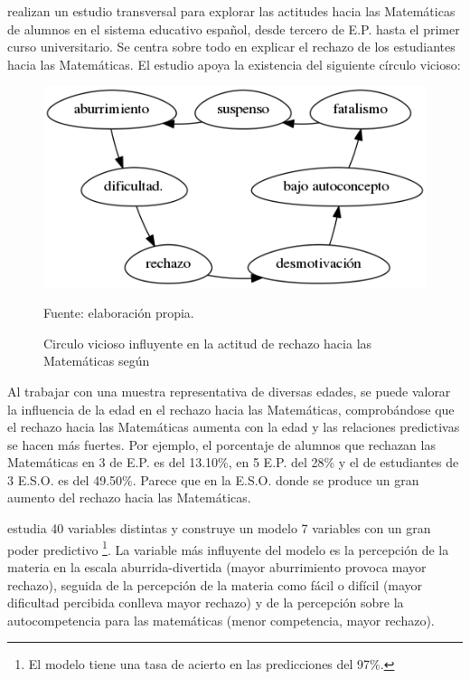 \label{sec:estudioNacional}
%
\citet*{ActitudesHaciaMates} realizan un estudio transversal para explorar las actitudes hacia las Matemáticas de alumnos en el sistema educativo español, desde tercero de E.P. hasta el primer curso universitario. 
%
Se centra sobre todo en explicar el rechazo de los estudiantes hacia las Matemáticas.
%
El estudio apoya la existencia del siguiente círculo vicioso: 



\begin{figure}[hbt]
\centering
\caption{Circulo vicioso influyente en la actitud de rechazo hacia las Matemáticas según \citep{ActitudesHaciaMates}}
\label{fig::circuloVicioso}
\includegraphics[scale=0.57]{img/circuloVicioso.png}

\small{Fuente: elaboración propia.}
\end{figure}
\FloatBarrier




Al trabajar con una muestra representativa de diversas edades, se puede valorar la influencia de la edad en el rechazo hacia las Matemáticas, comprobándose que el rechazo hacia las Matemáticas aumenta con la edad y las relaciones predictivas se hacen más fuertes.
%
Por ejemplo, el porcentaje de alumnos que rechazan las Matemáticas en 3 de E.P. es del 13.10\%, en 5 E.P. del 28\%  y el de estudiantes de 3 E.S.O. es del 49.50\%.
%
Parece que en la E.S.O. donde se produce un gran aumento del rechazo hacia las Matemáticas.


\cite{ActitudesHaciaMates} estudia 40 variables distintas y construye un modelo 7 variables con un gran poder predictivo 
%
\footnote{El modelo tiene una tasa de acierto en las predicciones del 97\%.}.
%
La variable más influyente del modelo es la percepción de la materia en la escala aburrida-divertida (mayor aburrimiento provoca mayor rechazo), seguida de la percepción de la materia como fácil o difícil (mayor dificultad percibida conlleva mayor rechazo) y de la percepción sobre la autocompetencia para las matemáticas (menor competencia, mayor rechazo).

